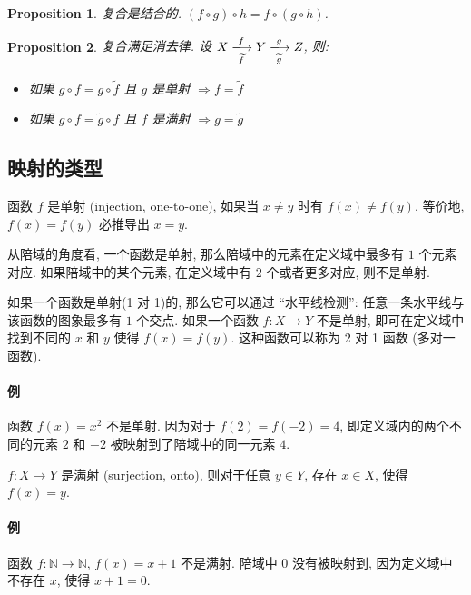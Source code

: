 \documentclass[UTF8]{ctexart}
\theoremstyle{mystyle}
\newtheorem{proposition}{Proposition}[section]
\theoremstyle{myremark}
\theoremstyle{plain}
\newcommand{\N}{\mathbb N}
\begin{document}
\begin{proposition}
    复合是结合的. $ (f \circ g) \circ h = f \circ (g \circ h) $.
\end{proposition}

\begin{proposition}
    复合满足消去律. 设 $ X \xlongrightarrow[\widetilde f]{f} Y \xlongrightarrow[\widetilde g]{g} Z $, 则:
    \begin{itemize}
        \item 如果 $ g \circ f = g \circ \widetilde{f} $ 且 $ g $ 是单射 $ \Longrightarrow f = \widetilde{f} $
        \item 如果 $ g \circ f = \widetilde{g} \circ f $ 且 $ f $ 是满射 $ \Longrightarrow g = \widetilde{g} $
    \end{itemize}
\end{proposition}

\subsection{映射的类型}
\begin{definition}[\text{单射/1 对 1}]
    函数 $ f $ 是单射 (injection, one-to-one), 如果当 $ x \neq y $ 时有 $ f(x) \neq f(y) $. 等价地, $ f(x) = f(y) $ 必推导出 $ x = y $.
\end{definition}

从陪域的角度看, 一个函数是单射, 那么陪域中的元素在定义域中最多有 $ 1 $ 个元素对应. 如果陪域中的某个元素, 在定义域中有 $ 2 $ 个或者更多对应, 则不是单射.

如果一个函数是单射(1 对 1)的, 那么它可以通过 ``水平线检测'': 任意一条水平线与该函数的图象最多有 $ 1 $ 个交点. 如果一个函数 $ f \colon X \to Y $ 不是单射, 即可在定义域中找到不同的 $ x $ 和 $ y $ 使得 $ f(x) = f(y) $. 这种函数可以称为 2 对 1 函数 (多对一函数).

\paragraph{例}
函数 $ f(x) = x^2 $ 不是单射. 因为对于 $ f(2) = f(-2) = 4 $, 即定义域内的两个不同的元素 $ 2 $ 和 $ -2 $ 被映射到了陪域中的同一元素 $ 4 $.

\begin{definition}[\text{满射/映上}]
    $ f \colon X \to Y $ 是满射 (surjection, onto), 则对于任意 $ y \in Y $, 存在 $ x \in X $, 使得 $ f(x) = y $.
\end{definition}

\paragraph{例}
函数 $ f \colon \N \to \N $, $ f(x) = x + 1 $ 不是满射. 陪域中 $ 0 $ 没有被映射到, 因为定义域中不存在 $ x $, 使得 $ x + 1 = 0 $.
\end{document}
